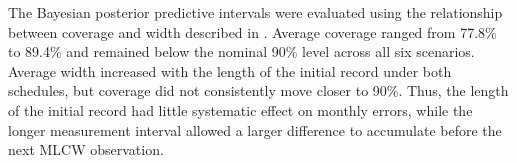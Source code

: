 The Bayesian posterior predictive intervals were evaluated using the relationship between coverage and width described in . Average coverage ranged from 77.8\% to 89.4\% and remained below the nominal 90\% level across all six scenarios. %
Average width increased with the length of the initial record under both schedules, but coverage did not consistently move closer to 90\%. %
Thus, the length of the initial record had little systematic effect on monthly errors, while the longer measurement interval allowed a larger difference to accumulate before the next MLCW observation.

